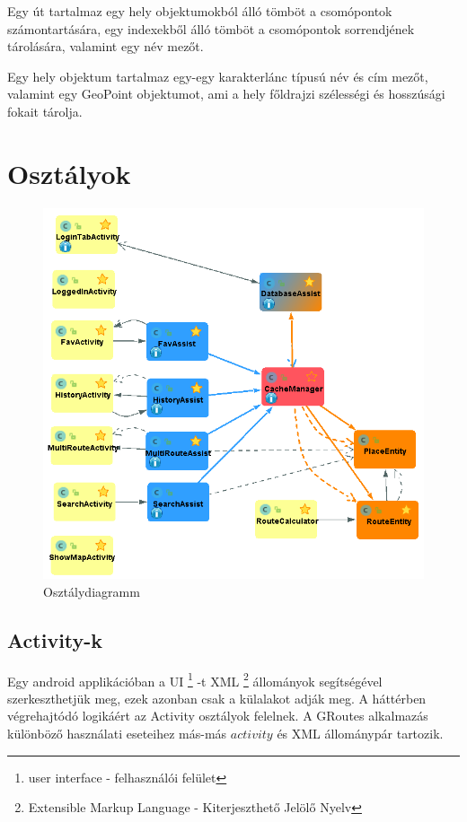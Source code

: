 Egy út tartalmaz egy hely objektumokból álló tömböt a csomópontok számontartására, egy indexekből álló tömböt a csomópontok sorrendjének tárolására, valamint egy név mezőt.

Egy hely objektum tartalmaz egy-egy karakterlánc típusú név és cím mezőt, valamint egy GeoPoint objektumot, ami a hely főldrajzi szélességi és hosszúsági fokait tárolja.
 

\section{Osztályok}\label{sec:ALAP:adatelem}

\begin{figure}
	\centering
	\setlength{\abovecaptionskip}{-10pt}
	\setlength{\belowcaptionskip}{0pt}
	\includegraphics[width=1\textwidth]{images/class_diagram}
	\caption{Osztálydiagramm\label{fig:ALAP:sm2}}
\end{figure}

\subsection{Activity-k}\label{sec:ALAP:adatelem}

Egy android applikációban a UI%
\footnote{ %
	user interface - felhasználói felület
}  %
-t XML%
\footnote{ %
	Extensible Markup Language - Kiterjeszthető Jelölő Nyelv
}  %
állományok segítségével szerkeszthetjük meg, ezek azonban csak a külalakot adják meg. A háttérben végrehajtódó logikáért az Activity osztályok felelnek. A GRoutes alkalmazás különböző használati eseteihez más-más \(activity\) és XML állománypár tartozik.

